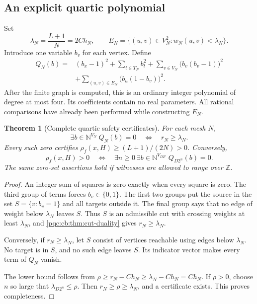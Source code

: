 \documentclass[11pt,letterpaper]{article}
\numberwithin{equation}{section}
\newtheorem{theorem}{Theorem}[section]
\theoremstyle{definition}
\theoremstyle{remark}
\newcommand{\N}{\mathbb N}
\newcommand{\Z}{\mathbb Z}
\begin{document}
\subsection{An explicit quartic polynomial}

Set
\[
 \lambda_N=\frac{L+1}{N}=2Ch_N,\qquad
 E_N=\{(u,v)\in V_N^2:w_N(u,v)<\lambda_N\}.
\]
Introduce one variable $b_v$ for each vertex.  Define
\begin{equation}
\begin{split}
 Q_N(b)={}&(b_x-1)^2+\sum_{t\in T_N}b_t^2
       +\sum_{v\in V_N}\bigl(b_v(b_v-1)\bigr)^2\\
       &+\sum_{(u,v)\in E_N}\bigl(b_u(1-b_v)\bigr)^2.
\end{split}
\label{pqc:cb:eq:quartic}
\end{equation}
After the finite graph is computed, this is an ordinary integer polynomial of
degree at most four.  Its coefficients contain no real parameters.  All
rational comparisons have already been performed while constructing $E_N$.

\begin{theorem}[Complete quartic safety certificates]
\label{pqc:cb:thm:quartic}
For each mesh $N$,
\begin{equation}
 \exists b\in\N^{V_N}\ Q_N(b)=0
 \quad\Longleftrightarrow\quad r_N\ge\lambda_N.
 \label{pqc:cb:eq:quartic-iff}
\end{equation}
Every such zero certifies $\rho_f(x,H)\ge (L+1)/(2N)>0$.  Conversely,
\begin{equation}
 \rho_f(x,H)>0
 \quad\Longleftrightarrow\quad
 \exists n\ge0\ \exists b\in\N^{V_{D2^n}}\ Q_{D2^n}(b)=0.
 \label{pqc:cb:eq:quartic-complete}
\end{equation}
The same zero-set assertions hold if witnesses are allowed to range over $\Z$.
\end{theorem}

\begin{proof}
An integer sum of squares is zero exactly when every square is zero.  The
third group of terms forces $b_v\in\{0,1\}$.  The first two groups put the
source in the set $S=\{v:b_v=1\}$ and all targets outside it.  The final group
says that no edge of weight below $\lambda_N$ leaves $S$.  Thus $S$ is an
admissible cut with crossing weights at least $\lambda_N$, and
\cref{pqc:cb:thm:cut-duality} gives $r_N\ge\lambda_N$.

Conversely, if $r_N\ge\lambda_N$, let $S$ consist of vertices reachable using
edges below $\lambda_N$.  No target is in $S$, and no such edge leaves $S$.
Its indicator vector makes every term of $Q_N$ vanish.

The lower bound follows from
$\rho\ge r_N-Ch_N\ge\lambda_N-Ch_N=Ch_N$.  If $\rho>0$, choose $n$ so large
that $\lambda_{D2^n}\le\rho$.  Then $r_N\ge\rho\ge\lambda_N$, and a certificate
exists.  This proves completeness.
\end{proof}
\end{document}
